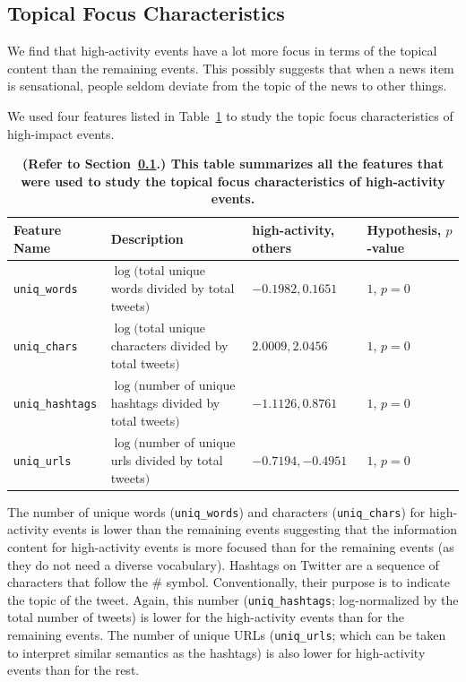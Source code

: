 \subsection{Topical Focus Characteristics}
\label{subsec:topical_focus}
We find that high-activity events have a lot more focus in terms of the
topical content than the remaining events. This possibly suggests that
when a news item is sensational, people seldom deviate from
the topic of the news to other things. 

We used four features listed in
Table~\ref{tab:topical_focus} to study the topic focus characteristics
of high-impact events.

\begin{table}
  \centering
  {\scriptsize
    \begin{tabular}{llll}
      \toprule
      Feature Name &  \multicolumn{1}{l}{Description} & high-activity, others & Hypothesis, $p$-value\\
      \midrule
      \texttt{uniq\_words} & \pbox{20cm}{$\log($total unique words \\divided by total tweets$)$} & $-0.1982, 0.1651$ & $1$, $p = 0$ \\
      \midrule
      \texttt{uniq\_chars} & \pbox{20cm}{$\log($total unique characters \\divided by total tweets$)$} & $2.0009, 2.0456$ & $1$, $p = 0$ \\
      \midrule
      \texttt{uniq\_hashtags} & \pbox{20cm}{$\log($number of unique hashtags\\ divided by total tweets$)$} & $-1.1126, 0.8761$ & $1$, $p = 0$ \\
      \midrule
      \texttt{uniq\_urls} & \pbox{20cm}{$\log($number of unique urls \\divided by total tweets$)$} & $-0.7194, -0.4951$ & $1$, $p = 0$ \\
      \bottomrule
    \end{tabular}
  }
  \caption{\textbf{(Refer to Section~\ref{subsec:topical_focus}.)
      This table summarizes all the features that were used to study the topical focus characteristics
      of high-activity events.}}
  \label{tab:topical_focus}
\end{table}

The number of unique words (\texttt{uniq\_words}) and characters
(\texttt{uniq\_chars}) for high-activity events is lower than the
remaining events suggesting that the information content for high-activity
events is more focused than for the remaining events (as they do not need
a diverse vocabulary). Hashtags on Twitter are a sequence of
characters that follow the \# symbol. Conventionally, their purpose is
to indicate the topic of the tweet. Again, this number
(\texttt{uniq\_hashtags}; log-normalized by the total number of
tweets) is lower for the high-activity events than for the remaining events.
The number of unique URLs (\texttt{uniq\_urls}; which can be
taken to interpret similar semantics as the hashtags) is also lower
for high-activity events than for the rest. 

